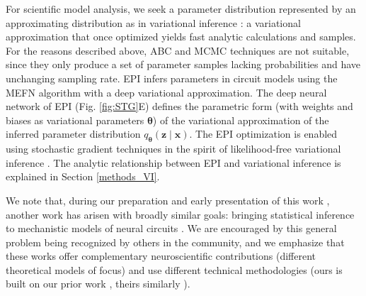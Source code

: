 \documentclass[11pt]{article}
\begin{document}
For scientific model analysis, we seek a parameter distribution represented by an approximating distribution as in variational inference \cite{saul1998mean}: a variational approximation that once optimized yields fast analytic calculations and samples.
For the reasons described above, ABC and MCMC techniques are not suitable, since they only produce a set of parameter samples lacking probabilities and have unchanging sampling rate.
EPI infers parameters in circuit models using the MEFN \cite{loaiza2017maximum} algorithm with a deep variational approximation.
The deep neural network of EPI (Fig. \ref{fig:STG}E) defines the parametric form (with weights and biases as variational parameters $\bm{\theta}$) of the variational approximation of the inferred parameter distribution $q_{\bm{\theta}}(\mathbf{z} \mid \mathbf{x})$.
The EPI optimization is enabled using stochastic gradient techniques in the spirit of likelihood-free variational inference \cite{tran2017hierarchical}.
The analytic relationship between EPI and variational inference is explained in Section \ref{methods_VI}.

 We note that, during our preparation and early presentation of this work \cite{bittner2019degenerate, bittner2019examining}, another work has arisen with broadly similar goals: bringing statistical inference to mechanistic models of neural circuits \cite{nonnenmacher2018sbi, desitler2019statistical, gonccalves2019training}.
We are encouraged by this general problem being recognized by others in the community, and we emphasize that these works offer complementary neuroscientific contributions (different theoretical models of focus) and use different technical methodologies (ours is built on our prior work \cite{loaiza2017maximum}, theirs similarly \cite{LueckmannGoncalves_17}).
\end{document}
